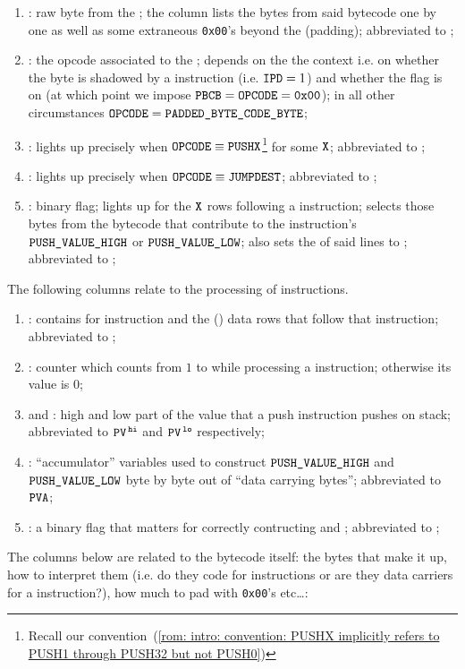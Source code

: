 \begin{enumerate}[resume]
    \item \PBCB{}:
	raw byte from the \limb{};
	the \pbcb{} column lists the bytes from said bytecode one by one as well as some extraneous \texttt{0x00}'s beyond the \CS{} (padding);
	abbreviated to \pbcb{};
    \item \opc{}:
	the opcode associated to the \pbcb{};
	depends on the the context i.e. on whether the byte is shadowed by a  instruction (i.e. \( \texttt{IPD}{}=1 \)) and whether the \CSR{} flag is on (at which point we impose $\texttt{PBCB}=\texttt{OPCODE}=\texttt{0x00}$);
	in all other circumstances \( \texttt{OPCODE}{} = \texttt{PADDED\_BYTE\_CODE\_BYTE}{} \);
    \item \IP{}:
	lights up precisely when
	$\texttt{OPCODE} \equiv \texttt{PUSHX}$\footnote{Recall our convention~(\ref{rom: intro: convention: PUSHX implicitly refers to PUSH1 through PUSH32 but not PUSH0})}
	for some $\texttt{X}$;
	abbreviated to \ip{};
    \item \opcodeIsJumpDest{}:
	lights up precisely when $\texttt{OPCODE} \equiv \texttt{JUMPDEST}$;
	abbreviated to \isValidJumpDestination{};
    \item \IPD{}:
	binary flag;
	lights up for the $\texttt{X}$ rows following a  instruction;
	selects those bytes from the bytecode that contribute to the  instruction's $\texttt{PUSH\_VALUE}\texttt{\_HIGH}$ or $\texttt{PUSH\_VALUE}\texttt{\_LOW}$;
	also sets the \opc{} of said lines to ;
	abbreviated to \ipd{};
\end{enumerate}
The following columns relate to the processing of  instructions.
\begin{enumerate}[resume]
    \item \PP{}:
	contains  for  instruction and the () data rows that follow that instruction;
	abbreviated to \pp{};
    \item \CP{}:
	counter which counts from $1$ to \PP{} while processing a  instruction;
	otherwise its value is $0$;
    \item \PV\HIGH{} and \PV\LOW{}:
	high and low part of the value that a push instruction pushes on stack;
	abbreviated to $\texttt{PV}^{\mathtt{\,hi}}$ and $\texttt{PV}^{\mathtt{\,lo}}$ respectively;
    \item \PVA:
	``accumulator'' variables used to construct $\texttt{PUSH\_VALUE}\texttt{\_HIGH}$ and $\texttt{PUSH\_VALUE}\texttt{\_LOW}$ byte by byte out of ``data carrying bytes'';
	abbreviated to $\texttt{PVA}$;
    \item \PFB{}:
	a binary flag that matters for correctly contructing \PV\HIGH{} and \PV\LOW{};
	abbreviated to \pfb{};
\end{enumerate}
The columns below are related to the bytecode itself: the bytes that make it up, how to interpret them (i.e. do they code for instructions or are they data carriers for a  instruction?), how much to pad with \texttt{0x00}'s etc\dots:

